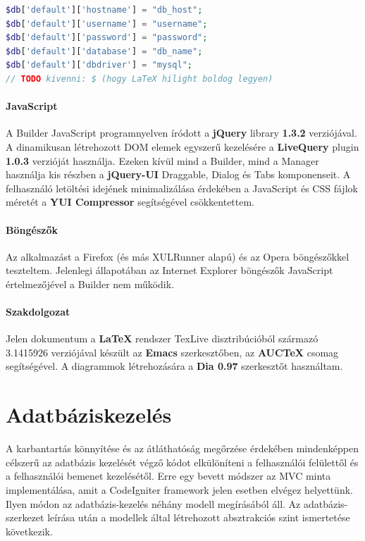 \documentclass[12pt,a4paper,twoside]{article}
\begin{document}
\begin{lstlisting}[language=PHP, firstnumber=40]
$db['default']['hostname'] = "db_host";
$db['default']['username'] = "username";
$db['default']['password'] = "password";
$db['default']['database'] = "db_name";
$db['default']['dbdriver'] = "mysql";
// TODO kivenni: $ (hogy LaTeX hilight boldog legyen)
\end{lstlisting}

\paragraph{JavaScript}
A Builder JavaScript programnyelven íródott a \textbf{jQuery}\cite{JQ} library
\textbf{1.3.2} verziójával. A dinamikusan létrehozott DOM elemek egyszerű
kezelésére a \textbf{LiveQuery}\cite{JQ-LiveQuery} plugin \textbf{1.0.3}
verzióját használja. Ezeken kívül mind a Builder, mind a Manager használja
kis részben a \textbf{jQuery-UI}\cite{JQ-UI} Draggable, Dialog és Tabs
komponenseit. A felhasználó letöltési idejének minimalizálása érdekében a
JavaScript és CSS fájlok méretét a \textbf{YUI Compressor}\cite{YUI} segítségével
csökkentettem.

\paragraph{Böngészők}
Az alkalmazást a Firefox (és más XULRunner alapú) és az Opera böngészőkkel
teszteltem. Jelenlegi állapotában az Internet Explorer böngészők JavaScript
értelmezőjével a Builder nem működik.

\paragraph{Szakdolgozat}
Jelen dokumentum a \textbf{LaTeX} rendszer TexLive disztribúcióból származó
3.1415926 verziójával készült az \textbf{Emacs} szerkesztőben, az
\textbf{AUCTeX} csomag segítségével. A diagrammok létrehozására a \textbf{Dia 0.97}
szerkesztőt használtam.


\clearpage
{}
\section{Adatbáziskezelés}

A karbantartás könnyítése és az átláthatóság megőrzése érdekében mindenképpen
célszerű az adatbázis kezelését végző kódot elkülöníteni a felhasználói
felülettől és a felhasználói bemenet kezelésétől. Erre egy bevett módszer az
MVC\cite{MVC} minta implementálása, amit a CodeIgniter framework jelen esetben
elvégez helyettünk. Ilyen módon az adatbázis-kezelés néhány modell megírásából
áll. Az adatbázis-szerkezet leírása után a modellek által létrehozott
absztrakciós szint ismertetése következik.
\end{document}
